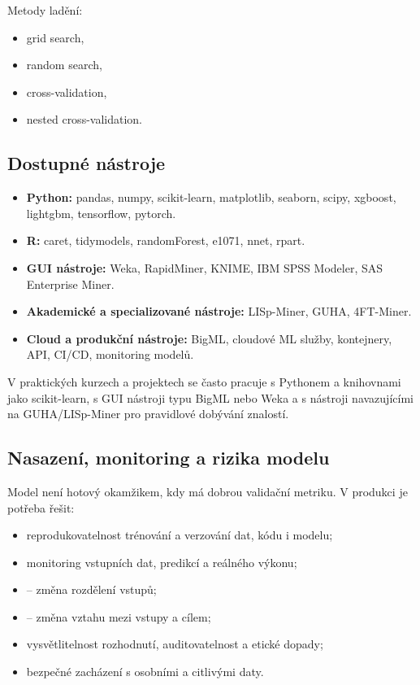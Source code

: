 Metody ladění:
\begin{itemize}
    \item grid search,
    \item random search,
    \item cross-validation,
    \item nested cross-validation.
\end{itemize}

\subsection{Dostupné nástroje}

\begin{itemize}
    \item \textbf{Python:}
    pandas, numpy, scikit-learn, matplotlib, seaborn, scipy, xgboost, lightgbm, tensorflow, pytorch.
    
    \item \textbf{R:}
    caret, tidymodels, randomForest, e1071, nnet, rpart.
    
    \item \textbf{GUI nástroje:}
    Weka, RapidMiner, KNIME, IBM SPSS Modeler, SAS Enterprise Miner.
    
    \item \textbf{Akademické a specializované nástroje:}
    LISp-Miner, GUHA, 4FT-Miner.
    
    \item \textbf{Cloud a produkční nástroje:}
    BigML, cloudové ML služby, kontejnery, API, CI/CD, monitoring modelů.
\end{itemize}

V praktických kurzech a projektech se často pracuje s Pythonem a knihovnami jako scikit-learn, s GUI
nástroji typu BigML nebo Weka a s nástroji navazujícími na GUHA/LISp-Miner pro pravidlové dobývání
znalostí.

\subsection{Nasazení, monitoring a rizika modelu}

Model není hotový okamžikem, kdy má dobrou validační metriku. V produkci je potřeba řešit:
\begin{itemize}
    \item reprodukovatelnost trénování a verzování dat, kódu i modelu;
    \item monitoring vstupních dat, predikcí a reálného výkonu;
    \item {} -- změna rozdělení vstupů;
    \item {} -- změna vztahu mezi vstupy a cílem;
    \item vysvětlitelnost rozhodnutí, auditovatelnost a etické dopady;
    \item bezpečné zacházení s osobními a citlivými daty.
\end{itemize}

